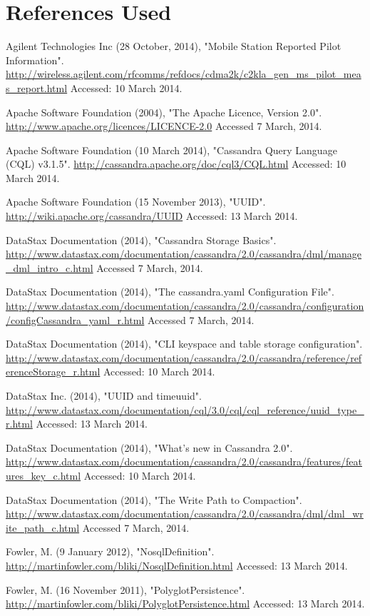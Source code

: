 \documentclass[letterpaper]{article}
\begin{document}
\section{References Used}

Agilent Technologies Inc (28 October, 2014), "Mobile Station Reported Pilot Information".
\url{http://wireless.agilent.com/rfcomms/refdocs/cdma2k/c2kla_gen_ms_pilot_meas_report.html}
Accessed: 10 March 2014.

Apache Software Foundation (2004), "The Apache Licence, Version 2.0".
\url{http://www.apache.org/licences/LICENCE-2.0}
Accessed 7 March, 2014.

Apache Software Foundation (10 March 2014), "Cassandra Query Language (CQL) v3.1.5".
\url{http://cassandra.apache.org/doc/cql3/CQL.html}
Accessed: 10 March 2014.

Apache Software Foundation (15 November 2013), "UUID".
\url{http://wiki.apache.org/cassandra/UUID}
Accessed: 13 March 2014.

DataStax Documentation (2014), "Cassandra Storage Basics".
\url{http://www.datastax.com/documentation/cassandra/2.0/cassandra/dml/manage_dml_intro_c.html}
Accessed 7 March, 2014.

DataStax Documentation (2014), "The cassandra.yaml Configuration File".
\url{http://www.datastax.com/documentation/cassandra/2.0/cassandra/configuration/configCassandra_yaml_r.html}
Accessed 7 March, 2014.  

DataStax Documentation (2014), "CLI keyspace and table storage configuration".
\url{http://www.datastax.com/documentation/cassandra/2.0/cassandra/reference/referenceStorage_r.html}
Accessed: 10 March 2014.

DataStax Inc. (2014), "UUID and timeuuid".
\url{http://www.datastax.com/documentation/cql/3.0/cql/cql_reference/uuid_type_r.html}
Accessed: 13 March 2014.

DataStax Documentation (2014), "What's new in Cassandra 2.0".
\url{http://www.datastax.com/documentation/cassandra/2.0/cassandra/features/features_key_c.html}
Accessed: 10 March 2014.

DataStax Documentation (2014), "The Write Path to Compaction".
\url{http://www.datastax.com/documentation/cassandra/2.0/cassandra/dml/dml_write_path_c.html}
Accessed 7 March, 2014.

Fowler, M. (9 January 2012), "NosqlDefinition".
\url{http://martinfowler.com/bliki/NosqlDefinition.html}
Accessed: 13 March 2014.

Fowler, M. (16 November 2011), "PolyglotPersistence".
\url{http://martinfowler.com/bliki/PolyglotPersistence.html}
Accessed: 13 March 2014.
\end{document}
